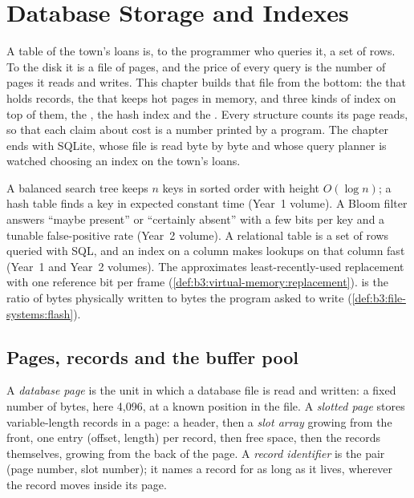 \chapter{Database Storage and Indexes}\label{ch:b3:database-storage}

A table of the town's loans is, to the programmer who queries it, a set of rows. To the disk it is a file of pages, and the price of every query is the number of pages it reads and writes. This chapter builds that file from the bottom: the  that holds records, the  that keeps hot pages in memory, and three kinds of index on top of them, the , the hash index and the . Every structure counts its page reads, so that each claim about cost is a number printed by a program. The chapter ends with SQLite, whose file is read byte by byte and whose query planner is watched choosing an index on the town's loans.

\begin{recall}
A balanced search tree keeps $n$ keys in sorted order with height $O(\log n)$; a hash table finds a key in expected constant time (Year~1 volume). A Bloom filter answers ``maybe present'' or ``certainly absent'' with a few bits per key and a tunable false-positive rate (Year~2 volume). A relational table is a set of rows queried with SQL, and an index on a column makes lookups on that column fast (Year~1 and Year~2 volumes). The  approximates least-recently-used replacement with one reference bit per frame (\cref{def:b3:virtual-memory:replacement}).  is the ratio of bytes physically written to bytes the program asked to write (\cref{def:b3:file-systems:flash}).
\end{recall}

\section{Pages, records and the buffer pool}\label{sec:b3:database-storage:pages}

\begin{definition}\label{def:b3:database-storage:page}
A \emph{database page} is the unit in which a database file is read and written: a fixed number of bytes, here 4,096, at a known position in the file. A \emph{slotted page} stores variable-length records in a page: a header, then a \emph{slot array} growing from the front, one entry (offset, length) per record, then free space, then the records themselves, growing from the back of the page. A \emph{record identifier} is the pair (page number, slot number); it names a record for as long as it lives, wherever the record moves inside its page.
\end{definition}

